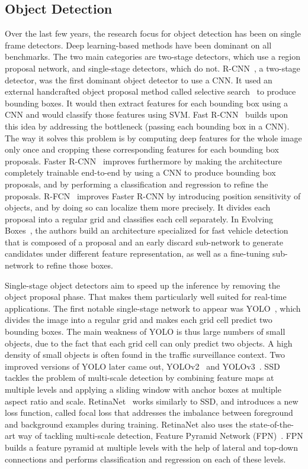 \documentclass[runningheads]{llncs}
\begin{document}
\subsection{Object Detection}
Over the last few years, the research focus for object detection has been on single frame detectors. Deep learning-based methods have been dominant on all benchmarks. The two main categories are two-stage detectors, which use a region proposal network, and single-stage detectors, which do not. R-CNN~\cite{rcnn_Girshick_2014_CVPR}, a two-stage detector, was the first dominant object detector to use a CNN. It used an external handcrafted object proposal method called selective search~\cite{uijlings2013selective} to produce bounding boxes. It would then extract features for each bounding box using a CNN and would classify those features using SVM. Fast R-CNN~\cite{Girshick_2015_ICCV_fast} builds upon this idea by addressing the bottleneck (passing each bounding box in a CNN). The way it solves this problem is by computing deep features for the whole image only once and cropping these corresponding features for each bounding box proposals. Faster R-CNN~\cite{ren2015faster} improves furthermore by making the architecture completely trainable end-to-end by using a CNN to produce bounding box proposals, and by performing a classification and regression to refine the proposals. R-FCN~\cite{RFCN_NIPS2016_6465} improves Faster R-CNN by introducing position sensitivity of objects, and by doing so can localize them more precisely. It divides each proposal into a regular grid and classifies each cell separately. In Evolving Boxes~\cite{EB_wang2017evolving}, the authors build an architecture specialized for fast vehicle detection that is composed of a proposal and an early discard sub-network to generate candidates under different feature representation, as well as a fine-tuning sub-network to refine those boxes.  

Single-stage object detectors aim to speed up the inference by removing the object proposal phase. That makes them particularly well suited for real-time applications. The first notable single-stage network to appear was YOLO~\cite{redmon2016you_yolo}, which divides the image into a regular grid and makes each grid cell predict two bounding boxes. The main weakness of YOLO is thus large numbers of small objects, due to the fact that each grid cell can only predict two objects. A high density of small objects is often found in the traffic surveillance context. Two improved versions of YOLO later came out, YOLOv2~\cite{redmon2016you_yolo} and YOLOv3~\cite{redmon2018yolov3}. SSD~\cite{liu2016ssd} tackles the problem of multi-scale detection by combining feature maps at multiple levels and applying a sliding window with anchor boxes at multiple aspect ratio and scale. RetinaNet~\cite{lin2018focal} works similarly to SSD, and introduces a new loss function, called focal loss that addresses the imbalance between foreground and background examples during training. RetinaNet also uses the state-of-the-art way of tackling multi-scale detection, Feature Pyramid Network (FPN)~\cite{Lin_2017_CVPR_FPN}. FPN builds a feature pyramid at multiple levels with the help of lateral and top-down connections and performs classification and regression on each of these levels. 
\end{document}
